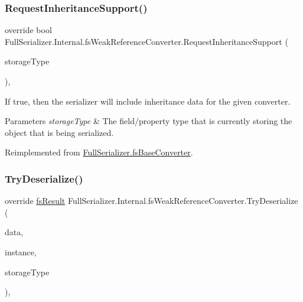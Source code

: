\subsubsection{\texorpdfstring{Request\+Inheritance\+Support()}{RequestInheritanceSupport()}}
{\footnotesize\ttfamily override bool Full\+Serializer.\+Internal.\+fs\+Weak\+Reference\+Converter.\+Request\+Inheritance\+Support (\begin{DoxyParamCaption}\item[{Type}]{storage\+Type }\end{DoxyParamCaption})\hspace{0.3cm}{\ttfamily [inline]}, {\ttfamily [virtual]}}



If true, then the serializer will include inheritance data for the given converter. 


\begin{DoxyParams}{Parameters}
{\em storage\+Type} & The field/property type that is currently storing the object that is being serialized.\\
\hline
\end{DoxyParams}


Reimplemented from \hyperlink{class_full_serializer_1_1fs_base_converter_a84447285540ab6b51efc2399d144c60c}{Full\+Serializer.\+fs\+Base\+Converter}.

\mbox{\label{class_full_serializer_1_1_internal_1_1fs_weak_reference_converter_a0b1b66f55b2e380a0b17f2944dc0ff84}} 
\subsubsection{\texorpdfstring{Try\+Deserialize()}{TryDeserialize()}}
{\footnotesize\ttfamily override \hyperlink{struct_full_serializer_1_1fs_result}{fs\+Result} Full\+Serializer.\+Internal.\+fs\+Weak\+Reference\+Converter.\+Try\+Deserialize (\begin{DoxyParamCaption}\item[{\hyperlink{class_full_serializer_1_1fs_data}{fs\+Data}}]{data,  }\item[{ref object}]{instance,  }\item[{Type}]{storage\+Type }\end{DoxyParamCaption})\hspace{0.3cm}{\ttfamily [inline]}, {\ttfamily [virtual]}}



